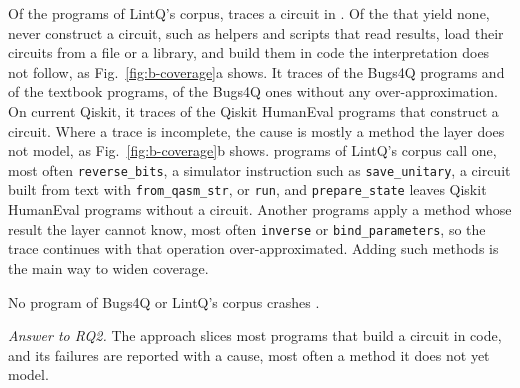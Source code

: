 Of the \numScaleSOneFiles{} programs of LintQ's corpus, \tool{} traces a circuit in \numScaleSOneSliced{}. Of the
\numCovNoCircuit{} that yield none, \numCovNoConstruction{} never construct a circuit, such as helpers and scripts that
read results, \numCovFromFile{} load their circuits from a file or a library, and \numCovOther{} build them in code the
interpretation does not follow, as Fig.~\ref{fig:b-coverage}a shows. It traces \numSubjBugsTraced{} of the \numSubjBugsCount{} Bugs4Q programs and
\numSubjTextTraced{} of the \numSubjTextCount{} textbook programs, \numToolBugsResolved{} of the Bugs4Q
ones without any over-approximation. On current Qiskit, it traces \numQheTracedOfBuildsPct{}
of the \numQheBuilds{} Qiskit HumanEval programs that construct a circuit. Where a trace is incomplete, the cause is mostly a
method the layer does not model, as Fig.~\ref{fig:b-coverage}b shows. \numUnmodMethodProgs{} programs of LintQ's corpus
call one, most often \texttt{reverse\_bits}, a simulator instruction such as \texttt{save\_unitary}, a circuit built
from text with \texttt{from\_qasm\_str}, or \texttt{run}, and \texttt{prepare\_state} leaves \numUnmodQhePrepare{} Qiskit
HumanEval programs without a circuit. Another \numUnmodUnknownProgs{} programs apply a method whose result the layer cannot know, most often
\texttt{inverse} or \texttt{bind\_parameters}, so the trace continues with that operation over-approximated. Adding such methods
is the main way to widen coverage.

No program of Bugs4Q or LintQ's corpus crashes \tool{}.

\emph{Answer to RQ2.} The approach slices most programs that build a circuit in code, and its failures are reported
with a cause, most often a method it does not yet model.

